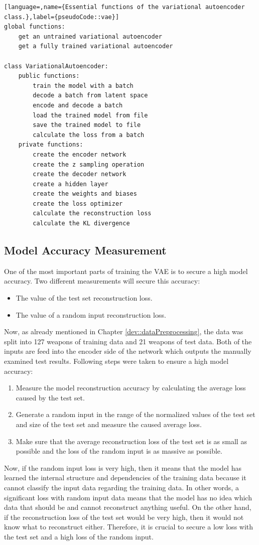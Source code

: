 \documentclass[MGS,Master,english]{twbook}%
\begin{document}
\begin{lstlisting}[language=,name={Essential functions of the variational autoencoder class.},label={pseudoCode::vae}]
global functions:
	get an untrained variational autoencoder
	get a fully trained variational autoencoder
	
class VariationalAutoencoder:
	public functions:
		train the model with a batch
		decode a batch from latent space
		encode and decode a batch
		load the trained model from file
		save the trained model to file
		calculate the loss from a batch
	private functions:
		create the encoder network
		create the z sampling operation
		create the decoder network
		create a hidden layer
		create the weights and biases
		create the loss optimizer
		calculate the reconstruction loss
		calculate the KL divergence
\end{lstlisting}

\subsection{Model Accuracy Measurement}
One of the most important parts of training the VAE is to secure a high model accuracy. Two different measurements will secure this accuracy:
\begin{itemize}
	\item The value of the test set reconstruction loss.
	\item The value of a random input reconstruction loss.
\end{itemize} 
Now, as already mentioned in Chapter \ref{dev::dataPreprocessing}, the data was split into 127 weapons of training data and 21 weapons of test data. Both of the inputs are feed into the encoder side of the network which outputs the manually examined test results. Following steps were taken to ensure a high model accuracy:
\begin{enumerate}
	\item Measure the model reconstruction accuracy by calculating the average loss caused by the test set.
	\item Generate a random input in the range of the normalized values of the test set and size of the test set and measure the caused average loss.
	\item Make sure that the average reconstruction loss of the test set is as small as possible and the loss of the random input is as massive as possible.
\end{enumerate}
Now, if the random input loss is very high, then it means that the model has learned the internal structure and dependencies of the training data because it cannot classify the input data regarding the training data. In other words, a significant loss with random input data means that the model has no idea which data that should be and cannot reconstruct anything useful. On the other hand, if the reconstruction loss of the test set would be very high, then it would not know what to reconstruct either. Therefore, it is crucial to secure a low loss with the test set and a high loss of the random input.
\end{document}
